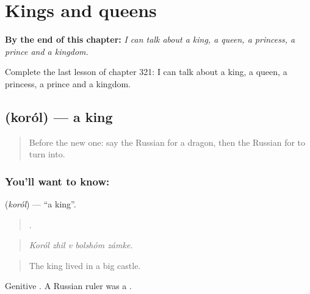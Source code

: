 
\chapter{Kings and queens}
\label{ch:ru-kings-and-queens}

\begin{chapteropening}
\textbf{By the end of this chapter:} \emph{I can talk about a king, a queen, a princess, a prince and a kingdom.}

Complete the last lesson of chapter 321: I can talk about a king, a queen, a princess, a prince and a kingdom.
\end{chapteropening}

\section[\texorpdfstring{\ru{король} (koról)}{король (koról)}]{ (koról) — a king}

\label{lesson:RU-C321-korol}



\begin{quote}
Before the new one: say the Russian for a dragon, then the Russian for to turn into.
\end{quote}

\subsection*{You'll want to know: }
\textbf{} (\emph{koról}) — \textquotedblleft{}a king\textquotedblright{}.

\begin{quote}
    .
\end{quote}

\begin{quote}
\emph{Koról zhil v bolshóm zámke.}
\end{quote}

\begin{quote}
The king lived in a big castle.
\end{quote}

Genitive \emph{}. A Russian ruler was a \emph{}.

